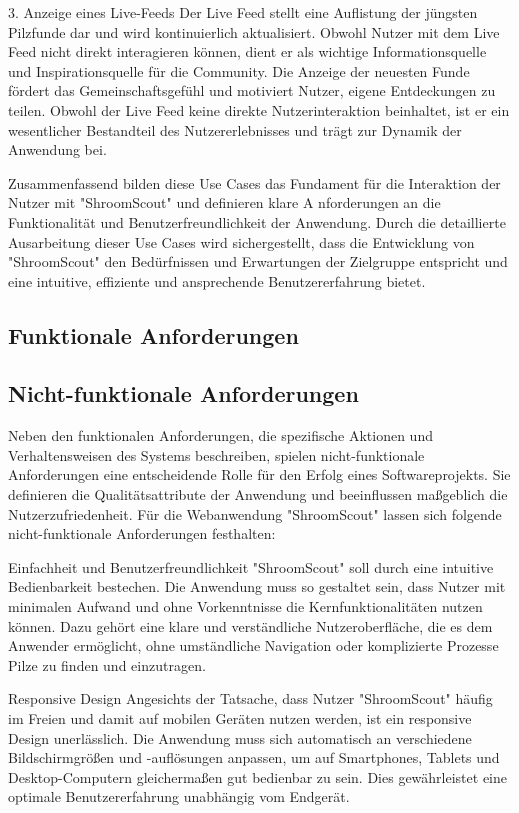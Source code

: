 \documentclass[../main.tex]{subfiles}
\begin{document}
3. Anzeige eines Live-Feeds
Der Live Feed stellt eine Auflistung der jüngsten Pilzfunde dar und wird kontinuierlich aktualisiert. Obwohl Nutzer mit dem 
Live Feed nicht direkt interagieren können, dient er als wichtige Informationsquelle und Inspirationsquelle für die Community. 
Die Anzeige der neuesten Funde fördert das Gemeinschaftsgefühl und motiviert Nutzer, eigene Entdeckungen zu teilen. Obwohl der 
Live Feed keine direkte Nutzerinteraktion beinhaltet, ist er ein wesentlicher Bestandteil des Nutzererlebnisses und trägt zur 
Dynamik der Anwendung bei.

Zusammenfassend bilden diese Use Cases das Fundament für die Interaktion der Nutzer mit "ShroomScout" und definieren klare A
nforderungen an die Funktionalität und Benutzerfreundlichkeit der Anwendung. Durch die detaillierte Ausarbeitung dieser Use 
Cases wird sichergestellt, dass die Entwicklung von "ShroomScout" den Bedürfnissen und Erwartungen der Zielgruppe entspricht 
und eine intuitive, effiziente und ansprechende Benutzererfahrung bietet.

\subsection{Funktionale Anforderungen} %

\subsection{Nicht-funktionale Anforderungen} %
Neben den funktionalen Anforderungen, die spezifische Aktionen und Verhaltensweisen des Systems beschreiben, spielen 
nicht-funktionale Anforderungen eine entscheidende Rolle für den Erfolg eines Softwareprojekts. Sie definieren die 
Qualitätsattribute der Anwendung und beeinflussen maßgeblich die Nutzerzufriedenheit. Für die Webanwendung "ShroomScout" 
lassen sich folgende nicht-funktionale Anforderungen festhalten:

Einfachheit und Benutzerfreundlichkeit
"ShroomScout" soll durch eine intuitive Bedienbarkeit bestechen. Die Anwendung muss so gestaltet sein, dass Nutzer mit 
minimalen Aufwand und ohne Vorkenntnisse die Kernfunktionalitäten nutzen können. Dazu gehört eine klare und verständliche 
Nutzeroberfläche, die es dem Anwender ermöglicht, ohne umständliche Navigation oder komplizierte Prozesse Pilze zu finden 
und einzutragen.

Responsive Design
Angesichts der Tatsache, dass Nutzer "ShroomScout" häufig im Freien und damit auf mobilen Geräten nutzen werden, ist ein 
responsive Design unerlässlich. Die Anwendung muss sich automatisch an verschiedene Bildschirmgrößen und -auflösungen 
anpassen, um auf Smartphones, Tablets und Desktop-Computern gleichermaßen gut bedienbar zu sein. Dies gewährleistet eine 
optimale Benutzererfahrung unabhängig vom Endgerät.
\end{document}
